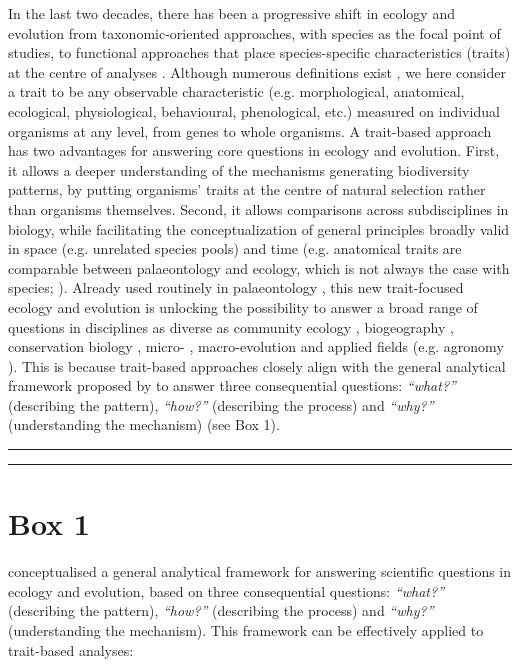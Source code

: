 \documentclass[12pt,letterpaper]{article}
\begin{document}
In the last two decades, there has been a progressive shift in ecology and evolution from  taxonomic-oriented approaches, with species as the focal point of studies, to functional approaches that place species-specific characteristics (traits) at the centre of analyses \citep{mammola2021concepts, palacio2022protocol}.
Although numerous definitions exist \citep{dawson2021traits}, we here consider a trait to be any observable characteristic (e.g. morphological, anatomical, ecological, physiological, behavioural, phenological, etc.) measured on individual organisms at any level, from genes to whole organisms.
A trait-based approach has two advantages for answering core questions in ecology and evolution.
First, it allows a deeper understanding of the mechanisms generating biodiversity patterns, by putting organisms' traits at the centre of natural selection rather than organisms themselves.
Second, it allows comparisons across subdisciplines in biology, while facilitating the conceptualization of general principles broadly valid in space (e.g. unrelated species pools) and time (e.g. anatomical traits are comparable between palaeontology and ecology, which is not always the case with species; \citealt{luza2023going}).
Already used routinely in palaeontology \citep{raup1961geometry, gould1991disparity, foote1995morphological, guillerme2020disparities}, this new trait-focused ecology and evolution is unlocking the possibility to answer a broad range of questions in disciplines as diverse as community ecology \citep{mcgill2006rebuilding}, biogeography \citep{violle2014emergence}, conservation biology \citep{chichorro2022trait}, micro- \citep{chapin1993evolution}, macro-evolution \citep{guillerme2023innovation} and applied fields (e.g. agronomy \citealt{martin2015plant}).
This is because trait-based approaches closely align with the general analytical framework proposed by \cite{anand1994pattern} to answer three consequential questions: \textit{``what?''} (describing the pattern), \textit{``how?''} (describing the process) and \textit{``why?''} (understanding the mechanism) (see Box 1).

\bigskip
\bigskip
\hrule
\hrule

\section*{Box 1}
\cite{anand1994pattern} conceptualised a general analytical framework for answering scientific questions in ecology and evolution, based on three consequential questions: \textit{``what?''} (describing the pattern), \textit{``how?''} (describing the process) and \textit{``why?''} (understanding the mechanism).
This framework can be effectively applied to trait-based analyses:
\end{document}
